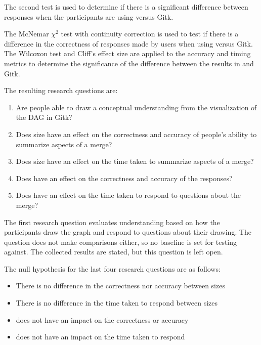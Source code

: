 The second test is used to determine if there is a significant
difference between responses when the participants are using \tool{}
versus Gitk.

The McNemar $\chi^2$ test\cite{McNemar1947} with
continuity correction is used to test if there is a difference in the
correctness of responses made by users when using \tool{} versus Gitk.
The Wilcoxon test\cite{Wilcoxon45} and Cliff's effect size\cite{Cliff93}
are applied to the accuracy and timing metrics to determine the
significance of the difference between the results in \tool{} and Gitk.

The resulting research questions are:

\begin{textbox}
  \begin{enumerate}
    \item Are people able to draw a conceptual understanding from the
      visualization of the DAG in Gitk?
    \item Does \mt{} size have an effect on the correctness and accuracy
      of people's ability to summarize aspects of a merge?
    \item Does \mt{} size have an effect on the time taken to summarize
      aspects of a merge?
    \item Does \tool{} have an effect on the correctness and accuracy of
      the responses?
    \item Does \tool{} have an effect on the time taken to respond to
      questions about the merge?
  \end{enumerate}
\end{textbox}

The first research question evaluates understanding based on how the
participants draw the graph and respond to questions about their
drawing.
The question does not make comparisons either, so no baseline is set for
testing against.
The collected results are stated, but this question is left open.

The null hypothesis for the last four research questions are as follows:
\begin{itemize}
  \item There is no difference in the correctness nor accuracy between
    \mt{} sizes
  \item There is no difference in the time taken to respond between
    \mt{} sizes
  \item \tool{} does not have an impact on the correctness or accuracy
  \item \tool{} does not have an impact on the time taken to respond
\end{itemize}

